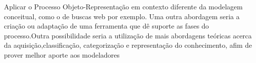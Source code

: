 Aplicar o Processo Objeto-Representação em contexto diferente da modelagem conceitual, como o de buscas web por exemplo. Uma outra abordagem seria a criação ou adaptação de uma ferramenta que dê suporte as fases do processo.Outra possibilidade seria a utilização de mais abordagens teóricas acerca da aquisição,classificação, categorização e representação do conhecimento, afim de prover melhor aporte aos modeladores
